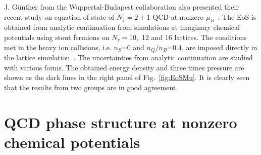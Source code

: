 \documentclass{PoS}
\begin{document}
 J. G\"unther from the Wuppertal-Budapest collaboration also presented their recent study on equation of state of $N_f=2+1$ QCD at nonzero $\mu_B$~\cite{Gunther:2016vcp}. The EoS is obtained from analytic continuation from simulations at imaginary chemical potentials using stout fermions on $N_\tau=10,$ 12 and 16 lattices. The conditions met in the heavy ion collisions, i.e. $n_S$=0 and $n_Q/n_B$=0.4, are imposed directly in the lattice simulation~\cite{ Bellwied:2015rza}. The uncertainties from analytic continuation are studied with various forms. The obtained energy density and three times pressure are shown as the dark lines in the right panel of Fig.~\ref{fig:EoSMu}. It is clearly seen that the results from two groups are in good agreement.
 






\section{QCD phase structure at nonzero chemical potentials}
\label{sec:PhaseMu}
\end{document}
